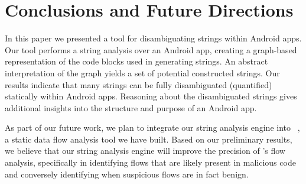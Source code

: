 
\section{Conclusions and Future Directions}
\label{sec:conclusion}
In this paper we presented a tool for disambiguating strings within Android
apps. Our tool performs a string analysis over an Android app,
creating a graph-based representation of the code blocks used in generating 
strings. An abstract interpretation of the graph yields a set of potential
constructed strings. Our results indicate that many strings can be fully
disambiguated (quantified) statically within Android apps. Reasoning
about the disambiguated strings gives additional insights into the structure and
purpose of an Android app.

As part of our future work, we plan to integrate our string analysis engine into
\bs~\cite{Blueseal}, a static data flow analysis tool we have built. Based on
our preliminary results, we believe that our string analysis engine will improve
the precision of \bs's flow analysis, specifically in identifying flows that are
likely present in malicious code and conversely identifying when suspicious
flows are in fact benign.

